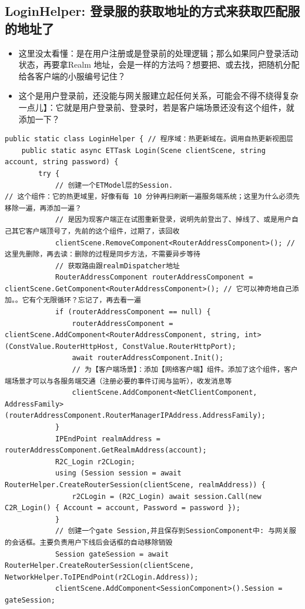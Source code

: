 \documentclass[9pt, b5paper]{article}
\begin{document}
\subsection{LoginHelper: 登录服的获取地址的方式来获取匹配服的地址了}
\label{sec:org0b668a8}
\begin{itemize}
\item 这里没太看懂：是在用户注册或是登录前的处理逻辑；那么如果同户登录活动状态，再要拿Realm 地址，会是一样的方法吗？想要把、或去找，把随机分配给各客户端的小服编号记住？
\item 这个是用户登录前，还没能与网关服建立起任何关系，可能会不得不绕得复杂一点儿】：它就是用户登录前、登录时，若是客户端场景还没有这个组件，就添加一下？
\end{itemize}
\begin{verbatim}
public static class LoginHelper { // 程序域：热更新域在。调用自热更新视图层
    public static async ETTask Login(Scene clientScene, string account, string password) {
        try {
            // 创建一个ETModel层的Session.
// 这个组件：它的热更域里，好像有每 10 分钟再扫刷新一遍服务端系统；这里为什么必须先移除一遍，再添加一遍？
            // 是因为现客户端正在试图重新登录，说明先前登出了、掉线了、或是用户自己其它客户端顶号了，先前的这个组件，过期了，该回收
            clientScene.RemoveComponent<RouterAddressComponent>(); // 这里先删除，再去读：删除的过程是同步方法，不需要异步等待
            // 获取路由跟realmDispatcher地址
            RouterAddressComponent routerAddressComponent = clientScene.GetComponent<RouterAddressComponent>(); // 它可以神奇地自己添加。。它有个无限循环？忘记了，再去看一遍
            if (routerAddressComponent == null) {
                routerAddressComponent = clientScene.AddComponent<RouterAddressComponent, string, int>(ConstValue.RouterHttpHost, ConstValue.RouterHttpPort);
                await routerAddressComponent.Init();
                // 为【客户端场景】：添加【网络客户端】组件。添加了这个组件，客户端场景才可以与各服务端交通（注册必要的事件订阅与监听），收发消息等
                clientScene.AddComponent<NetClientComponent, AddressFamily>(routerAddressComponent.RouterManagerIPAddress.AddressFamily);
            }
            IPEndPoint realmAddress = routerAddressComponent.GetRealmAddress(account);
            R2C_Login r2CLogin;
            using (Session session = await RouterHelper.CreateRouterSession(clientScene, realmAddress)) {
                r2CLogin = (R2C_Login) await session.Call(new C2R_Login() { Account = account, Password = password });
            }
            // 创建一个gate Session,并且保存到SessionComponent中: 与网关服的会话框。主要负责用户下线后会话框的自动移除销毁
            Session gateSession = await RouterHelper.CreateRouterSession(clientScene, NetworkHelper.ToIPEndPoint(r2CLogin.Address));
            clientScene.AddComponent<SessionComponent>().Session = gateSession;


\end{verbatim}
\end{document}
